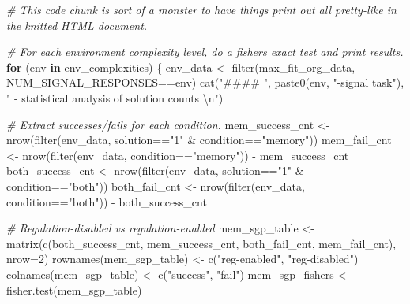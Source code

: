\documentclass[
]{book}
\newenvironment{Shaded}{\begin{snugshade}}{\end{snugshade}}
\newcommand{\AttributeTok}[1]{\textcolor[rgb]{0.77,0.63,0.00}{#1}}
\newcommand{\CommentTok}[1]{\textcolor[rgb]{0.56,0.35,0.01}{\textit{#1}}}
\newcommand{\ControlFlowTok}[1]{\textcolor[rgb]{0.13,0.29,0.53}{\textbf{#1}}}
\newcommand{\DecValTok}[1]{\textcolor[rgb]{0.00,0.00,0.81}{#1}}
\newcommand{\FunctionTok}[1]{\textcolor[rgb]{0.00,0.00,0.00}{#1}}
\newcommand{\NormalTok}[1]{#1}
\newcommand{\OtherTok}[1]{\textcolor[rgb]{0.56,0.35,0.01}{#1}}
\newcommand{\SpecialCharTok}[1]{\textcolor[rgb]{0.00,0.00,0.00}{#1}}
\newcommand{\StringTok}[1]{\textcolor[rgb]{0.31,0.60,0.02}{#1}}
\begin{document}
\begin{Shaded}
\begin{Highlighting}[]
\CommentTok{\# This code chunk is sort of a monster to have things print out all pretty{-}like in the knitted HTML document.}

\CommentTok{\# For each environment complexity level, do a fisher\textquotesingle{}s exact test and print results.}
\ControlFlowTok{for}\NormalTok{ (env }\ControlFlowTok{in}\NormalTok{ env\_complexities) \{}
\NormalTok{  env\_data }\OtherTok{\textless{}{-}} \FunctionTok{filter}\NormalTok{(max\_fit\_org\_data, NUM\_SIGNAL\_RESPONSES}\SpecialCharTok{==}\NormalTok{env)}
  \FunctionTok{cat}\NormalTok{(}\StringTok{"\#\#\#\# "}\NormalTok{, }\FunctionTok{paste0}\NormalTok{(env, }\StringTok{"{-}signal task"}\NormalTok{), }\StringTok{" {-} statistical analysis of solution counts  }\SpecialCharTok{\textbackslash{}n}\StringTok{"}\NormalTok{)}

  \CommentTok{\# Extract successes/fails for each condition.}
\NormalTok{  mem\_success\_cnt }\OtherTok{\textless{}{-}} \FunctionTok{nrow}\NormalTok{(}\FunctionTok{filter}\NormalTok{(env\_data, solution}\SpecialCharTok{==}\StringTok{"1"} \SpecialCharTok{\&}\NormalTok{ condition}\SpecialCharTok{==}\StringTok{"memory"}\NormalTok{))}
\NormalTok{  mem\_fail\_cnt }\OtherTok{\textless{}{-}} \FunctionTok{nrow}\NormalTok{(}\FunctionTok{filter}\NormalTok{(env\_data, condition}\SpecialCharTok{==}\StringTok{"memory"}\NormalTok{)) }\SpecialCharTok{{-}}\NormalTok{ mem\_success\_cnt}
\NormalTok{  both\_success\_cnt }\OtherTok{\textless{}{-}} \FunctionTok{nrow}\NormalTok{(}\FunctionTok{filter}\NormalTok{(env\_data, solution}\SpecialCharTok{==}\StringTok{"1"} \SpecialCharTok{\&}\NormalTok{ condition}\SpecialCharTok{==}\StringTok{"both"}\NormalTok{))}
\NormalTok{  both\_fail\_cnt }\OtherTok{\textless{}{-}} \FunctionTok{nrow}\NormalTok{(}\FunctionTok{filter}\NormalTok{(env\_data, condition}\SpecialCharTok{==}\StringTok{"both"}\NormalTok{)) }\SpecialCharTok{{-}}\NormalTok{ both\_success\_cnt}

  \CommentTok{\# Regulation{-}disabled vs regulation{-}enabled}
\NormalTok{  mem\_sgp\_table }\OtherTok{\textless{}{-}} \FunctionTok{matrix}\NormalTok{(}\FunctionTok{c}\NormalTok{(both\_success\_cnt,}
\NormalTok{                            mem\_success\_cnt,}
\NormalTok{                            both\_fail\_cnt,}
\NormalTok{                            mem\_fail\_cnt),}
                          \AttributeTok{nrow=}\DecValTok{2}\NormalTok{)}
  \FunctionTok{rownames}\NormalTok{(mem\_sgp\_table) }\OtherTok{\textless{}{-}} \FunctionTok{c}\NormalTok{(}\StringTok{"reg{-}enabled"}\NormalTok{, }\StringTok{"reg{-}disabled"}\NormalTok{)}
  \FunctionTok{colnames}\NormalTok{(mem\_sgp\_table) }\OtherTok{\textless{}{-}} \FunctionTok{c}\NormalTok{(}\StringTok{"success"}\NormalTok{, }\StringTok{"fail"}\NormalTok{)}
\NormalTok{  mem\_sgp\_fishers }\OtherTok{\textless{}{-}} \FunctionTok{fisher.test}\NormalTok{(mem\_sgp\_table)}


\end{Highlighting}
\end{Shaded}
\end{document}
